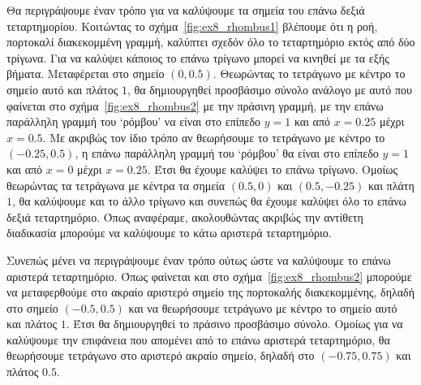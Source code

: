 \begin{solution}
    Θα περιγράψουμε έναν τρόπο για να καλύψουμε τα σημεία του επάνω
    δεξιά τεταρτημορίου. Κοιτώντας το σχήμα~\ref{fig:ex8_rhombus1} βλέπουμε ότι
    η ροή, πορτοκαλί διακεκομμένη γραμμή, καλύπτει σχεδόν όλο το τεταρτημόριο
    εκτός από δύο τρίγωνα. Για να καλύψει κάποιος το επάνω τρίγωνο μπορεί να
    κινηθεί με τα εξής βήματα. Μεταφέρεται στο σημείο \( (0, 0.5) \). Θεωρώντας
    το τετράγωνο με κέντρο το σημείο αυτό και πλάτος \( 1 \), θα δημιουργηθεί
    προσβάσιμο σύνολο ανάλογο με αυτό που φαίνεται στο
    σχήμα~\ref{fig:ex8_rhombus2} με την πράσινη γραμμή, με την επάνω παράλληλη
    γραμμή του \enquote*{ρόμβου} να είναι στο επίπεδο \( y = 1 \) και από \( x =
    0.25 \) μέχρι \( x = 0.5 \). Με ακριβώς τον ίδιο τρόπο αν θεωρήσουμε το
    τετράγωνο με κέντρο το \( (-0.25, 0.5) \), η επάνω παράλληλη γραμμή του
    \enquote*{ρόμβου} θα είναι στο επίπεδο \( y = 1 \) και από \( x =
    0 \) μέχρι \( x = 0.25 \). Έτσι θα έχουμε καλύψει το επάνω τρίγωνο. Ομοίως
    θεωρώντας τα τετράγωνα με κέντρα τα σημεία \( (0.5, 0) \) και \( (0.5,
    -0.25) \) και πλάτη \( 1 \), θα καλύψουμε και το άλλο τρίγωνο και συνεπώς
    θα έχουμε καλύψει όλο το επάνω δεξιά τεταρτημόριο. Όπως αναφέραμε,
    ακολουθώντας ακριβώς την αντίθετη διαδικασία μπορούμε να καλύψουμε το κάτω
    αριστερά τεταρτημόριο.

    Συνεπώς μένει να περιγράψουμε έναν τρόπο ούτως ώστε να καλύψουμε το επάνω
    αριστερά τεταρτημόριο. Όπως φαίνεται και στο σχήμα~\ref{fig:ex8_rhombus2}
    μπορούμε να μεταφερθούμε στο ακραίο αριστερό σημείο της πορτοκαλής
    διακεκομμένης, δηλαδή στο σημείο \( (-0.5, 0.5) \) και να θεωρήσουμε
    τετράγωνο με κέντρο το σημείο αυτό και πλάτος \( 1 \). Έτσι θα δημιουργηθεί
    το πράσινο προσβάσιμο σύνολο. Ομοίως για να καλύψουμε την επιφάνεια που
    απομένει από το επάνω αριστερά τεταρτημόριο, θα θεωρήσουμε τετράγωνο στο
    αριστερό ακραίο σημείο, δηλαδή στο \( (-0.75, 0.75) \) και πλάτος \( 0.5 \).


\end{solution}
